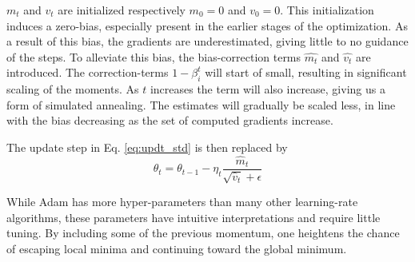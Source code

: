 $m_t$ and $v_t$ are initialized respectively $m_0=0$ and $v_0=0$. This initialization induces a zero-bias, especially present in the earlier stages of the optimization. As a result of this bias, the gradients are underestimated, giving little to no guidance of the steps. To alleviate this bias, the bias-correction terms $\hat{m_t}$ and $\hat{v_t}$ are introduced. The correction-terms $1-\beta_i^t$ will start of small, resulting in significant scaling of the moments. As $t$ increases the term will also increase, giving us a form of simulated annealing. The estimates will gradually be scaled less, in line with the bias decreasing as the set of computed gradients increase. 

The update step in Eq. \ref{eq:updt_std} is then replaced by
\begin{equation}
    \theta_{t} = \theta_{t-1} - \eta_t \frac{\hat{m}_t}{\sqrt{\hat{v}_t}+\epsilon}
\end{equation}

While Adam has more hyper-parameters than many other learning-rate algorithms, these parameters have intuitive interpretations and require little tuning. 
By including some of the previous momentum, one heightens the chance of escaping local minima and continuing toward the global minimum. 


